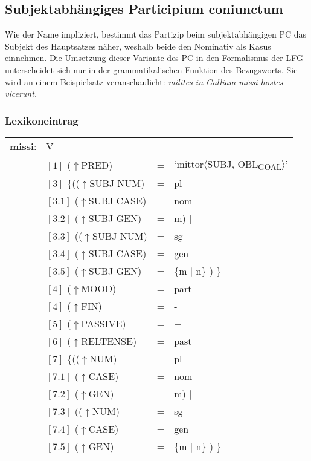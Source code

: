 \documentclass[12pt,a4paper]{article}
\begin{document}
\subsection{Subjektabhängiges Participium coniunctum}
Wie der Name impliziert, bestimmt das Partizip beim subjektabhängigen PC das Subjekt des Hauptsatzes näher, weshalb beide den Nominativ als Kasus einnehmen. Die Umsetzung dieser Variante des PC in den Formalismus der LFG unterscheidet sich nur in der grammatikalischen Funktion des Bezugsworts. Sie wird an einem Beispielsatz veranschaulicht:
\textit{milites in Galliam missi hostes vicerunt.}

\subsubsection{Lexikoneintrag}
\begin{singlespace}
\begin{tabular}{ l  l  l  l  } 
\textbf{missi}: & V \\
$\qquad$ & $[1]$ \:  ($\uparrow$PRED) & = & `mittor$\langle$SUBJ, OBL\textsubscript{GOAL}$\rangle$'\\
$\qquad$ & $[3]$ \:  \{(($\uparrow$SUBJ NUM) & = & pl \\ 
$\qquad$ & $[3.1]$ \:  ($\uparrow$SUBJ CASE) & = & nom \\
$\qquad$ & $[3.2]$ \:  ($\uparrow$SUBJ GEN) & = & m) $\mid$\\
$\qquad$ & $[3.3]$ \:  (($\uparrow$SUBJ NUM) & = & sg \\ 
$\qquad$ & $[3.4]$ \: ($\uparrow$SUBJ CASE) & = & gen \\
$\qquad$ & $[3.5]$ \:  ($\uparrow$SUBJ GEN) & = & \{m $\mid$ n\} ) \} \\
$\qquad$ & $[4]$ \:  ($\uparrow$MOOD) & = & part \\
$\qquad$ & $[4]$ \:  ($\uparrow$FIN) & = & - \\
$\qquad$ & $[5]$ \:  ($\uparrow$PASSIVE) & = & + \\
$\qquad$ & $[6]$ \: ($\uparrow$RELTENSE) & = & past \\
$\qquad$ & $[7]$ \:  \{(($\uparrow$NUM) & = & pl \\ 
$\qquad$ & $[7.1]$ \:  ($\uparrow$CASE) & = & nom \\
$\qquad$ & $[7.2]$ \:  ($\uparrow$GEN) & = & m) $\mid$\\
$\qquad$ & $[7.3]$ \:  (($\uparrow$NUM) & = & sg \\ 
$\qquad$ & $[7.4]$ \: ($\uparrow$CASE) & = & gen \\
$\qquad$ & $[7.5]$ \:  ($\uparrow$GEN) & = & \{m $\mid$ n\} ) \} \\
\end{tabular}
\end{singlespace}
\end{document}
